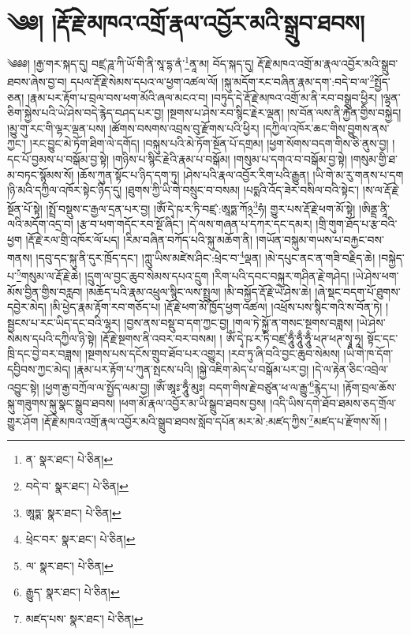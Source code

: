 \setcounter{footnote}{0} 
\chapter{༄༅། །རྡོ་རྗེ་མཁའ་འགྲོ་རྣལ་འབྱོར་མའི་སྒྲུབ་ཐབས།}༄༅༅། །རྒྱ་གར་སྐད་དུ། བཛྲ་ཌཱ་ཀི་ཡོ་གི་ནི་སཱ་དྷ་ནཾ་\footnote{ན་  སྣར་ཐང་།  པེ་ཅིན། }ནཱ་མ། བོད་སྐད་དུ། རྡོ་རྗེ་མཁའ་འགྲོ་མ་རྣལ་འབྱོར་མའི་སྒྲུབ་ཐབས་ཞེས་བྱ་བ། དཔལ་རྡོ་རྗེ་སེམས་དཔའ་ལ་ཕྱག་འཚལ་ལོ། །སྐུ་མདོག་རང་བཞིན་རྣམ་དག་:བདེ་བ་ལ་\footnote{བདེ་བ་  སྣར་ཐང་།  པེ་ཅིན། }སྤྱོད་ཅན། །རྣམ་པར་རྟོག་པ་བྲལ་བས་ཕག་མོའི་ཞལ་མངའ་བ། །བཏུད་དེ་རྡོ་རྗེ་མཁའ་འགྲོ་མ་ནི་རབ་བསྒྲུབ་ཕྱིར། །ལྷན་ཅིག་སྐྱེས་པའི་ཡེ་ཤེས་བདེ་རྙེད་བཤད་པར་བྱ། །སྔགས་པ་ཤེས་རབ་སྙིང་རྗེར་ལྡན། །ས་བོན་ལས་ནི་རྐྱེན་གྱིས་བསྐྱེད། །མྱུ་གུ་རང་གི་ལྷར་ལྡན་པས། །ཚོགས་བསགས་འབྲས་བུ་རྫོགས་པའི་ཕྱིར། །དཀྱིལ་འཁོར་ཆང་གིས་བྱུགས་ནས་ཀྱང་། །རང་བྱུང་མེ་ཏོག་ཐིག་ལེ་དགོད། །བསྐུས་པའི་མེ་ཏོག་སྔོན་པོ་དགྲམ། །ཕྱག་སོགས་བདག་གིས་ཅི་ནུས་བྱ། །དང་པོ་བྱམས་པ་བསྒོམ་བྱ་སྟེ། །གཉིས་པ་སྙིང་རྗེའི་རྣམ་པ་བསྒོམ། །གསུམ་པ་དགའ་བ་བསྒོམ་བྱ་སྟེ། །གསུམ་གྱི་ཐ་མ་བཏང་སྙོམས་སོ། །ཆོས་ཀུན་སྟོང་པ་ཉིད་དག་ཏུ། །ཤེས་པའི་རྣལ་འབྱོར་རིག་པའི་རྒྱུན། །ཡི་གེ་མ་རུ་གནས་པ་དག །ཉི་མའི་དཀྱིལ་འཁོར་སྟེང་ཉིད་དུ། །ཐུགས་ཀྱི་ཡི་གེ་བསྲུང་བ་བསམ། །པདྨའི་འོད་ཟེར་བསིལ་བའི་སྟེང་། །ས་ལ་རྡོ་རྗེ་སྔོན་པོ་སྟེ། །སྤྲོ་བསྡུས་ང་རྒྱལ་དྲན་པར་བྱ། །ཨོཾ་དྭེ་ཥ་ར་ཏི་བཛྲ་:ཨཱཏྨ་ཀོ྅\footnote{ཨཱཏྨ་  སྣར་ཐང་།  པེ་ཅིན། }ཧཾ། གྱུར་པས་རྡོ་རྗེ་ཕག་མོ་སྟེ། །ཨིནྡྲ་ནཱི་ལའི་མདོག་འདྲ་བ། །རྩ་བ་ཕག་གདོང་རབ་སྔོ་ཞིང་། །དེ་ལས་གཞན་པ་དཀར་དང་དམར། །གྲི་གུག་ཐོད་པ་རྩ་བའི་ཕྱག །རྡོ་རྗེ་རལ་གྲི་འཁོར་ལོ་པད། །རིམ་བཞིན་བཀོད་པའི་སྐུ་མཆོག་ནི། །གཡོན་བསྐུམ་གཡས་པ་བརྐྱང་བས་གནས། །དབུ་དང་སྐུ་ནི་དུར་ཁྲོད་དང་། །ཀླུ་ཡིས་མཛེས་ཤིང་:ཕྲེང་བ་\footnote{ཕྲེང་བར་  སྣར་ཐང་།  པེ་ཅིན། }ལྡན། །མེ་དཔུང་ནང་ན་གཟི་བརྗིད་ཆེ། །བསྐྱེད་པ་\footnote{ལ་  སྣར་ཐང་།  པེ་ཅིན། }གསུམ་ལ་རྡོ་རྗེ་ཆེ། །དྲུག་ལ་བྱང་ཆུབ་སེམས་དཔའ་དྲུག །རིག་པའི་དབང་བསྐུར་གཤིན་རྗེ་གཤེད། །ཡེ་ཤེས་ཕག་མོས་བྱིན་གྱིས་བརླབ། །མཆོད་པའི་རྣམ་འཕྲུལ་སྙིང་ལས་སྤྲུལ། །མི་བསྐྱོད་རྡོ་རྗེ་ཡེ་ཤེས་ཆེ། །ཞེ་སྡང་བདག་པོ་ཐུགས་དབྱེར་མེད། །མི་ཕྱེད་རྣམ་རྟོག་རབ་གཅོད་པ། །རྡོ་རྗེ་ཕག་མོ་ཁྱོད་ཕྱག་འཚལ། །འཕྲོས་པས་སྙིང་གའི་ས་བོན་ཏེ། །སྦྱངས་པ་རང་ཡིད་དང་བའི་ལྷར། །བྱས་ནས་བསྡུ་བ་དག་ཀྱང་བྱ། །གལ་ཏེ་སྐྱོ་ན་གསང་སྔགས་བཟླས། །ཡེ་ཤེས་སེམས་དཔའི་དཀྱིལ་ཉི་སྟེ། །རྡོ་རྗེ་སྔགས་ནི་འབར་བར་བསམ། །
ཨོཾ་དྭེ་ཥ་ར་ཏི་བཛྲ་ཧཱུྃ་ཧཱུྃ་ཧཱུྃ་ཕཊ་ཕཊ་སྭཱ་ཧཱ། སྟོང་དང་ཁྲི་དང་བྱེ་བར་བཟླས། །སྔགས་པས་དངོས་གྲུབ་ཐོབ་པར་འགྱུར། །རབ་ཏུ་ཞི་བའི་བྱང་ཆུབ་སེམས། །ཡི་གེ་ཁ་དོག་དབྱིབས་ཀྱང་མེད། །རྣམ་པར་རྟོག་པ་ཀུན་སྤངས་པའི། །སྐྱེ་འཇིག་མེད་པ་བསྒོམ་པར་བྱ། །དེ་ལ་རྟེན་ཅིང་འབྲེལ་འབྱུང་སྟེ། །ཕྱག་རྒྱ་བཀྲོལ་ལ་སྤྱོད་ལམ་བྱ། །ཨོཾ་ཨཱཿ་ཧཱུྃ་མུཿ། བདག་གིས་རྗེ་བཙུན་ཕ་ལ་རྒྱུ་\footnote{རྒྱུད་  སྣར་ཐང་།  པེ་ཅིན། }རྙེད་པ། །རྟོག་བྲལ་ཆོས་སྐུ་གཟུགས་སྐུ་སྣང་སྒྲུབ་ཐབས། །ཕག་མོ་རྣལ་འབྱོར་མ་ཡི་སྒྲུབ་ཐབས་བྱས། །འདི་ཡིས་དགེ་ཐོབ་ཐམས་ཅད་གྲོལ་གྱུར་ཤོག །རྡོ་རྗེ་མཁའ་འགྲོ་རྣལ་འབྱོར་མའི་སྒྲུབ་ཐབས་སློབ་དཔོན་མར་མེ་:མཛད་ཀྱིས་\footnote{མཛད་པས་  སྣར་ཐང་།  པེ་ཅིན། }མཛད་པ་རྫོགས་སོ། ། 